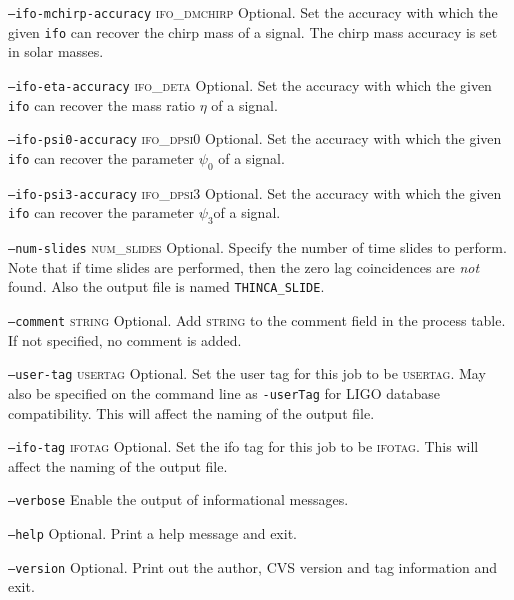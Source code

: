 \begin{entry}
\begin{entry}
\item[\texttt{--ifo-mchirp-accuracy} \textsc{ifo\_dmchirp}] Optional. Set the
accuracy with which the given \texttt{ifo} can recover the chirp mass of a
signal.  The chirp mass accuracy is set in solar masses.

\item[\texttt{--ifo-eta-accuracy} \textsc{ifo\_deta}] Optional. Set the
accuracy with which the given \texttt{ifo} can recover the mass ratio $\eta$
of a signal.

\item[\texttt{--ifo-psi0-accuracy} \textsc{ifo\_dpsi0}] Optional. Set the
accuracy with which the given \texttt{ifo} can recover the parameter
$\psi_{0}$ of a signal.

\item[\texttt{--ifo-psi3-accuracy} \textsc{ifo\_dpsi3}] Optional. Set the
accuracy with which the given \texttt{ifo} can recover the parameter
$\psi_{3}$of a signal.

\item[\texttt{--num-slides} \textsc{num\_slides}] Optional.  Specify the
number of time slides to perform.  Note that if time slides are performed,
then the zero lag coincidences are \textit{not} found.  Also the output file
is named \texttt{THINCA\_SLIDE}.

\item[\texttt{--comment} \textsc{string}] Optional. Add \textsc{string}
to the comment field in the process table. If not specified, no comment
is added. 

\item[\texttt{--user-tag} \textsc{usertag}] Optional. Set the user tag for
this job to be \textsc{usertag}. May also be specified on the command line as
\texttt{-userTag} for LIGO database compatibility.  This will affect the
naming of the output file.

\item[\texttt{--ifo-tag} \textsc{ifotag}] Optional. Set the ifo tag for this
job to be \textsc{ifotag}. This will affect the naming of the output file.

\item[\texttt{--verbose}] Enable the output of informational messages.

\item[\texttt{--help}] Optional.  Print a help message and exit.

\item[\texttt{--version}] Optional.  Print out the author, CVS version and
tag information and exit.


\end{entry}
\end{entry}
